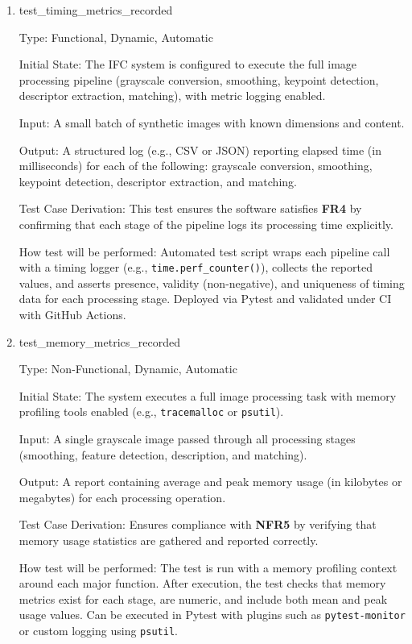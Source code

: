 \documentclass[12pt, titlepage]{article}
\begin{document}
\begin{enumerate}

\item{test\_timing\_metrics\_recorded\\}

Type: Functional, Dynamic, Automatic
        
Initial State: The IFC system is configured to execute the full image processing pipeline (grayscale conversion, smoothing, keypoint detection, descriptor extraction, matching), with metric logging enabled.

Input: A small batch of synthetic images with known dimensions and content.

Output: A structured log (e.g., CSV or JSON) reporting elapsed time (in milliseconds) for each of the following: grayscale conversion, smoothing, keypoint detection, descriptor extraction, and matching.

Test Case Derivation: This test ensures the software satisfies \textbf{FR4} by confirming that each stage of the pipeline logs its processing time explicitly.

How test will be performed: Automated test script wraps each pipeline call with a timing logger (e.g., \texttt{time.perf\_counter()}), collects the reported values, and asserts presence, validity (non-negative), and uniqueness of timing data for each processing stage. Deployed via Pytest and validated under CI with GitHub Actions.
  

\item{test\_memory\_metrics\_recorded\\}

Type: Non-Functional, Dynamic, Automatic
          
Initial State: The system executes a full image processing task with memory profiling tools enabled (e.g., \texttt{tracemalloc} or \texttt{psutil}).

Input: A single grayscale image passed through all processing stages (smoothing, feature detection, description, and matching).

Output: A report containing average and peak memory usage (in kilobytes or megabytes) for each processing operation.

Test Case Derivation: Ensures compliance with \textbf{NFR5} by verifying that memory usage statistics are gathered and reported correctly.

How test will be performed: The test is run with a memory profiling context around each major function. After execution, the test checks that memory metrics exist for each stage, are numeric, and include both mean and peak usage values. Can be executed in Pytest with plugins such as \texttt{pytest-monitor} or custom logging using \texttt{psutil}.
  

\end{enumerate}
\end{document}
